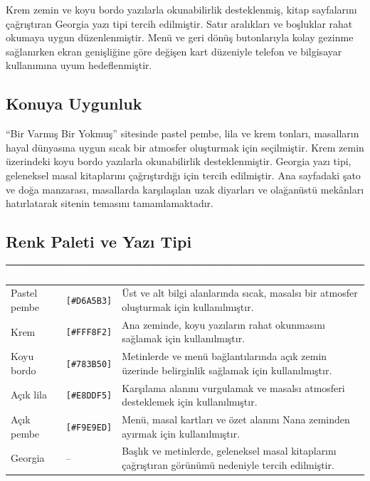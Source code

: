 \documentclass[12pt,a4paper]{article}
\begin{document}
Krem zemin ve koyu bordo yazılarla okunabilirlik desteklenmiş, kitap sayfalarını çağrıştıran Georgia yazı tipi tercih edilmiştir. Satır aralıkları ve boşluklar rahat okumaya uygun düzenlenmiştir. Menü ve geri dönüş butonlarıyla kolay gezinme sağlanırken ekran genişliğine göre değişen kart düzeniyle telefon ve bilgisayar kullanımına uyum hedeflenmiştir.

\subsection{Konuya Uygunluk}
“Bir Varmış Bir Yokmuş” sitesinde pastel pembe, lila ve krem tonları, masalların hayal dünyasına uygun sıcak bir atmosfer oluşturmak için seçilmiştir. Krem zemin üzerindeki koyu bordo yazılarla okunabilirlik desteklenmiştir. Georgia yazı tipi, geleneksel masal kitaplarını çağrıştırdığı için tercih edilmiştir. Ana sayfadaki şato ve doğa manzarası, masallarda karşılaşılan uzak diyarları ve olağanüstü mekânları hatırlatarak sitenin temasını tamamlamaktadır.

\subsection{Renk Paleti ve Yazı Tipi}
\begin{center}
\begin{tabular}{@{}llp{6.4cm}@{}}
\toprule
\rowcolor{ana}\textcolor{white}{\textbf{Ad}} & \textcolor{white}{\textbf{Kod}} & \textcolor{white}{\textbf{Nerede / neden kullandınız?}} \\
\midrule
 \relax Pastel pembe & \texttt {[\#D6A5B3]}   &  Üst ve alt bilgi alanlarında sıcak, masalsı bir atmosfer oluşturmak için kullanılmıştır. \\
\relax Krem & \texttt {[\#FFF8F2]}  & Ana zeminde, koyu yazıların rahat okunmasını sağlamak için kullanılmıştır.\\
\relax Koyu bordo & \texttt {[\#783B50]}  & Metinlerde ve menü bağlantılarında açık zemin üzerinde belirginlik sağlamak için kullanılmıştır.\\
\relax Açık lila & \texttt {[\#E8DDF5]}  & Karşılama alanını vurgulamak ve masalsı atmosferi desteklemek için kullanılmıştır.\\
\relax Açık pembe & \texttt {[\#F9E9ED]}  & Menü, masal kartları ve özet alanını Nana zeminden ayırmak için kullanılmıştır. \\ 
\relax Georgia & -- & Başlık ve metinlerde, geleneksel masal kitaplarını çağrıştıran görünümü nedeniyle tercih edilmiştir. \\
\bottomrule
\end{tabular}
\end{center}
\end{document}
